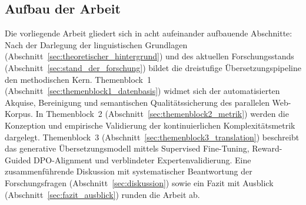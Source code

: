 \subsection{Aufbau der Arbeit}
\label{sec:aufbau_der_arbeit}

Die vorliegende Arbeit gliedert sich in acht aufeinander aufbauende Abschnitte: Nach der Darlegung der linguistischen Grundlagen (Abschnitt~\ref{sec:theoretischer_hintergrund}) und des aktuellen Forschungsstands (Abschnitt~\ref{sec:stand_der_forschung}) bildet die dreistufige Übersetzungspipeline den methodischen Kern. Themenblock~1 (Abschnitt~\ref{sec:themenblock1_datenbasis}) widmet sich der automatisierten Akquise, Bereinigung und semantischen Qualitätssicherung des parallelen Web-Korpus. In Themenblock~2 (Abschnitt~\ref{sec:themenblock2_metrik}) werden die Konzeption und empirische Validierung der kontinuierlichen Komplexitätsmetrik dargelegt. Themenblock~3 (Abschnitt~\ref{sec:themenblock3_translation}) beschreibt das generative Übersetzungsmodell mittels Supervised Fine-Tuning, Reward-Guided DPO-Alignment und verblindeter Expertenvalidierung. Eine zusammenführende Diskussion mit systematischer Beantwortung der Forschungsfragen (Abschnitt~\ref{sec:diskussion}) sowie ein Fazit mit Ausblick (Abschnitt~\ref{sec:fazit_ausblick}) runden die Arbeit ab.
